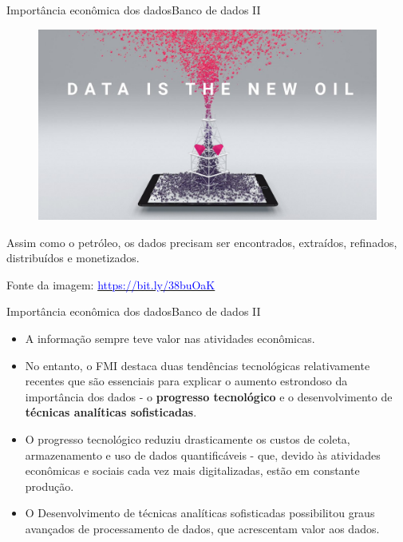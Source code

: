 \documentclass[t]{beamer}
\begin{document}

\begin{ftst}{Importância econômica dos dados}{Banco de dados II}
\begin{figure}
    \centering
    \includegraphics[scale=0.2]{Figuras/slide00_04.jpg}
\end{figure}
\begin{center}
    Assim como o petróleo, os dados precisam ser encontrados, extraídos, refinados, distribuídos e monetizados.
\end{center}
\vone
\vone


\tiny
Fonte da imagem: \href{https://bit.ly/38buOaK}{\textcolor{blue}{https://bit.ly/38buOaK}}
\end{ftst}


\begin{ftst}{Importância econômica dos dados}{Banco de dados II}
\small
\begin{itemize}
    \item A informação sempre teve valor nas atividades econômicas. 
    \item No entanto, o FMI destaca duas tendências tecnológicas relativamente recentes que são essenciais para explicar o aumento estrondoso da importância dos dados - o \textbf{progresso tecnológico} e o desenvolvimento de \textbf{técnicas analíticas sofisticadas}.
    \item O progresso tecnológico reduziu drasticamente os custos de coleta, armazenamento e uso de dados quantificáveis - que, devido às atividades econômicas e sociais cada vez mais digitalizadas, estão em constante produção.
    \item O Desenvolvimento de técnicas analíticas sofisticadas possibilitou graus avançados de processamento de dados, que acrescentam valor aos dados.
\end{itemize}

\end{ftst}
\end{document}
